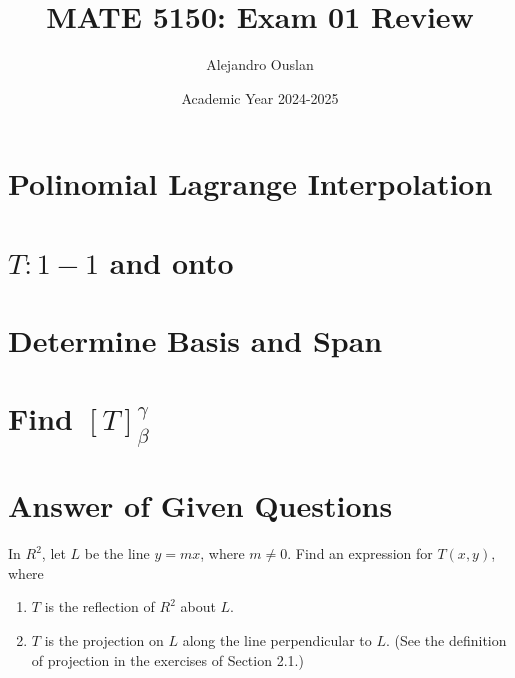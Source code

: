 \documentclass[10pt, oneside]{article}
\title{MATE 5150: Exam 01 Review}
\author{Alejandro Ouslan}
\date{Academic Year 2024-2025}
\begin{document}
\maketitle
\tableofcontents

\vspace{.25in}

\section{Polinomial Lagrange Interpolation}

\section{$T: 1-1$ and onto}

\section{Determine Basis and Span}

\section{Find $[T]_{\beta}^{\gamma}$}

\section{Answer of Given Questions}

In $R^2$, let $L$ be the line $y = mx$, where $m \neq 0$. Find an expression for $T(x, y)$, where
\begin{enumerate}
	\item $T$ is the reflection of $R^2$ about $L$.
	\item $T$ is the projection on $L$ along the line perpendicular to $L$. (See the definition of projection in the exercises of Section 2.1.)
\end{enumerate}
\end{document}
